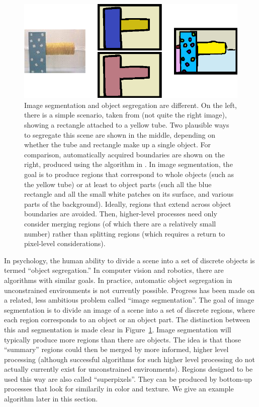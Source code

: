 \begin{figure}

\centerline{\includegraphics[width=0.75\columnwidth]{fig-seg}}

\caption{
%
Image segmentation and object segregation are different.  On the left,
there is a simple scenario, taken from 
(not quite the right image),
showing a rectangle attached to a yellow tube.  Two 
plausible ways to segregate this scene are shown in the middle,
depending on whether the tube and rectangle make up a single 
object.
For
comparison, automatically acquired boundaries are shown on the right,
produced using the algorithm in
. 
In image segmentation, the goal is to
produce regions that correspond to whole objects (such as the yellow
tube) or at least to object parts (such all the blue rectangle and all
the small white patches on its surface, and various parts of the
background).  Ideally, regions that extend across object boundaries
are avoided.  Then, higher-level processes need only consider merging
regions (of which there are a relatively small number) rather than
splitting regions (which requires a return to pixel-level
considerations).  
%
%
}

\label{fig:image-segmentation}

\end{figure}



In psychology, the human ability to divide a scene into a set of
discrete objects is termed ``object segregation.''  
In computer vision and robotics, there are algorithms with 
similar goals.  In practice, automatic object segregation
in unconstrained environments is not currently possible.
%
Progress has been made on a related, less ambitious problem
called ``image segmentation''.  The goal of image segmentation
is to divide an image of a scene into a set of discrete
regions, where each region corresponds to an object or 
an object part.  The distinction between this and 
segmentation is made clear in Figure~\ref{fig:image-segmentation}.
%
Image segmentation will typically produce more regions than there are
objects.  The idea is that those ``summary'' regions could then be
merged by more informed, higher level processing (although successful
algorithms for such higher level processing do not actually currently
exist for unconstrained environments).  Regions designed to be
used this way are also called ``superpixels''.
%
They can be produced by bottom-up processes that look for 
similarily in color and texture.  We give an example algorithm later
in this section.
%


